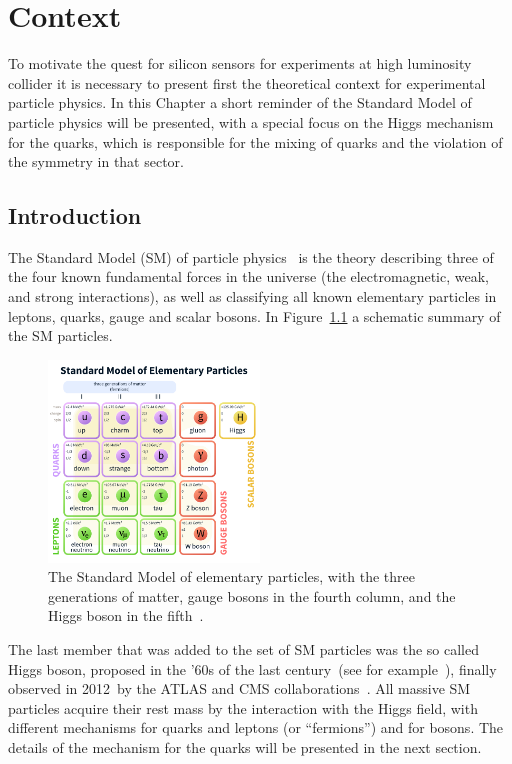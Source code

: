 \chapter{Context}

To motivate the quest for silicon sensors for experiments at high luminosity collider it is necessary 
to present first the theoretical context for experimental particle physics. In this Chapter a short 
reminder of the Standard Model of particle physics will be presented, with a special focus on 
the Higgs mechanism for the quarks, which is responsible for the mixing of quarks and the 
violation of the \CP symmetry in that sector.

\section{Introduction}
\label{sec:intro}

The Standard Model (SM) of particle physics~\cite{GLASHOW1961579,PhysRevLett.19.1264,SalamSM,PhysRevLett.30.1343,PhysRevLett.30.1346} is the theory describing three of the four known fundamental forces in the universe (the electromagnetic, weak, and strong interactions), as well as classifying all known elementary particles in leptons, quarks, gauge and scalar bosons. In Figure~\ref{fig:SM} a schematic summary of the SM 
particles.


\begin{figure}[htbp]
   \centering
   \includegraphics[width=0.5\textwidth]{SM.png} %
   \caption{The Standard Model of elementary particles, with the three generations of matter, gauge bosons in the fourth column, and the Higgs boson in the fifth~\cite{wiki:xxx}.}
   \label{fig:SM}
\end{figure}

The last member that was added to the set of SM particles was the so called Higgs boson, proposed in the '60s of the last century~(see for example~\cite{HIGGS1964132,PhysRevLett.13.321}),  finally observed in 2012~by the ATLAS and CMS collaborations~\cite{20121,201230}.
All massive SM particles acquire their rest mass by the interaction with the Higgs field, with different 
mechanisms for quarks and leptons (or ``fermions'') and for bosons. The details of the mechanism for 
the quarks will be presented in the next section.

